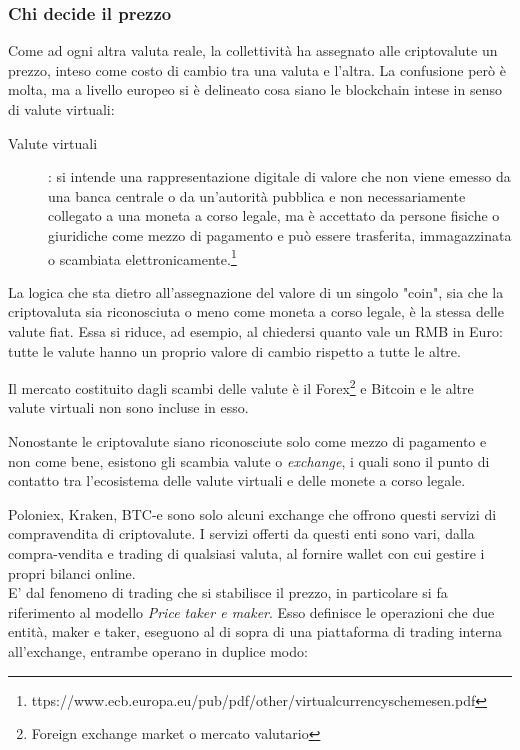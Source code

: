 \subsubsection{Chi decide il prezzo}\label{sssec:chidecideilprezzo}


Come ad ogni altra valuta reale, la collettività ha assegnato alle criptovalute un prezzo, inteso come costo di cambio tra una valuta e l'altra. La confusione però è molta, ma a livello europeo si è delineato cosa siano le blockchain intese in senso di valute virtuali:

\begin{description}
	\item[Valute virtuali]:  si intende una rappresentazione digitale di valore che non viene emesso da una banca centrale o da un’autorità pubblica e non necessariamente collegato a una moneta a corso legale, ma è accettato da persone fisiche o giuridiche come mezzo di pagamento e può essere trasferita, immagazzinata o scambiata elettronicamente.\footnote{ttps://www.ecb.europa.eu/pub/pdf/other/virtualcurrencyschemesen.pdf}
\end{description}

La logica che sta dietro all'assegnazione del valore di un singolo "coin", sia che la criptovaluta sia riconosciuta o meno come moneta a corso legale, è la stessa delle valute fiat. Essa si riduce, ad esempio, al chiedersi quanto vale un RMB in Euro: tutte le valute hanno un proprio valore di cambio rispetto a tutte le altre. 

Il mercato costituito dagli scambi delle valute è il Forex\footnote{Foreign exchange market o mercato valutario} e Bitcoin e le altre valute virtuali non sono incluse in esso.

Nonostante le criptovalute siano riconosciute solo come mezzo di pagamento e non come bene, esistono gli scambia valute o \textit{exchange}, i quali sono il punto di contatto tra l'ecosistema delle valute virtuali e delle monete a corso legale. 

Poloniex, Kraken, BTC-e sono solo alcuni exchange che offrono questi servizi di compravendita di criptovalute. I servizi offerti da questi enti sono vari, dalla compra-vendita e trading di qualsiasi valuta, al fornire wallet con cui gestire i propri bilanci online.\\

E' dal fenomeno di trading che si stabilisce il prezzo, in particolare si fa riferimento al modello \textit{Price taker e maker}. Esso definisce le operazioni che due entità, maker e taker, eseguono al di sopra di una piattaforma di trading interna all'exchange, entrambe operano in duplice modo:

